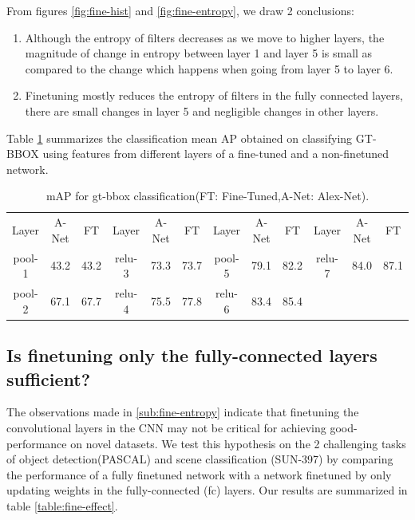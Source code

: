 \documentclass[runningheads]{llncs}
\begin{document}
From figures \ref{fig:fine-hist} and \ref{fig:fine-entropy}, we draw 2 conclusions:
\begin{enumerate}
\item Although the entropy of filters decreases as we move to higher layers, the magnitude of change in entropy between layer 1 and layer 5 is small as compared to the change which happens when going from layer 5 to layer 6.
\item Finetuning mostly reduces the entropy of filters in the fully connected layers, there are small changes in layer 5 and negligible changes in other layers.
\end{enumerate} 
Table \ref{table:gt-bbox-fine} summarizes the classification mean AP obtained on classifying GT-BBOX  using features from different layers of a fine-tuned and a non-finetuned network.
\setlength{\tabcolsep}{4pt}
\begin{table}[t!]
\begin{center}
\caption{mAP for gt-bbox classification(FT: Fine-Tuned,A-Net: Alex-Net).}
\label{table:gt-bbox-fine}
\begin{tabular}{ccc|ccc|ccc|ccc}
\hline\noalign{\smallskip}
Layer & A-Net & FT & Layer & A-Net & FT & Layer & A-Net & FT & Layer & A-Net & FT \\
\noalign{\smallskip}
\hline
\noalign{\smallskip}
pool-1 & 43.2 & 43.2  & relu-3 & 73.3 & 73.7 & pool-5 & 79.1 & 82.2 & relu-7 & 84.0 & 87.1 \\
pool-2  & 67.1 & 67.7 & relu-4 & 75.5 & 77.8 & relu-6 & 83.4 & 85.4 \\
\hline
\end{tabular}
\end{center}
\end{table}
\setlength{\tabcolsep}{1.4pt}

\subsection{Is finetuning only the fully-connected layers sufficient?}
\label{sub:fine-fc-only}
The observations made in \ref{sub:fine-entropy} indicate that finetuning the convolutional layers in the CNN may not be critical for achieving good-performance on novel datasets. We test this hypothesis on the 2 challenging tasks of object detection(PASCAL) and scene classification (SUN-397) by comparing the performance of a fully finetuned network with a network finetuned by only updating weights in the fully-connected (fc) layers. Our results are summarized in table \ref{table:fine-effect}.
\end{document}
